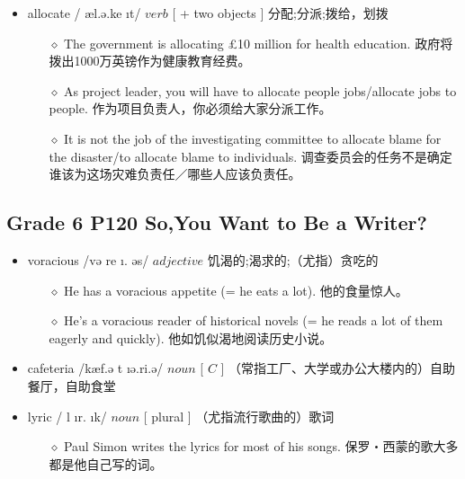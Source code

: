 \documentclass[a4paper,top=2.5cm,buttom=2.5cm10.5pt]{book}
\begin{document}
\begin{itemize}
\item allocate / \textprimstress æl.ə.ke \i t/ $ verb $ [ + two objects ] 分配;分派;拨给，划拨
\begin{itemize}
\item[$\diamond$] The government is allocating £10 million for health education.
政府将拨出1000万英镑作为健康教育经费。
\item[$\diamond$] As project leader, you will have to allocate people jobs/allocate jobs to people.
作为项目负责人，你必须给大家分派工作。
\item[$\diamond$] It is not the job of the investigating committee to allocate blame for the disaster/to allocate blame to individuals.
调查委员会的任务不是确定谁该为这场灾难负责任／哪些人应该负责任。
\end{itemize}
\end{itemize}
\textcolor[RGB]{128,0,255}{\section{Grade 6 P120 So,You Want to Be a Writer?}}
\begin{itemize}
\item voracious /və \textprimstress re \i . \textesh əs/ $ adjective $  饥渴的;渴求的;（尤指）贪吃的
\begin{itemize}
\item[$\diamond$] He has a voracious appetite (= he eats a lot).
他的食量惊人。
\item[$\diamond$] He's a voracious reader of historical novels (= he reads a lot of them eagerly and quickly).
他如饥似渴地阅读历史小说。
\end{itemize}
\end{itemize}
\begin{itemize}
\item cafeteria /\textsecstress kæf.ə \textprimstress t \i ə.ri.ə/ $ noun $ [  $ C $  ] （常指工厂、大学或办公大楼内的）自助餐厅，自助食堂
\end{itemize}
\begin{itemize}
\item lyric / \textprimstress l \i r. \i k/ $ noun $ [ plural ] （尤指流行歌曲的）歌词
\begin{itemize}
\item[$\diamond$] Paul Simon writes the lyrics for most of his songs.
保罗‧西蒙的歌大多都是他自己写的词。
\end{itemize}
\end{itemize}
\end{document}
